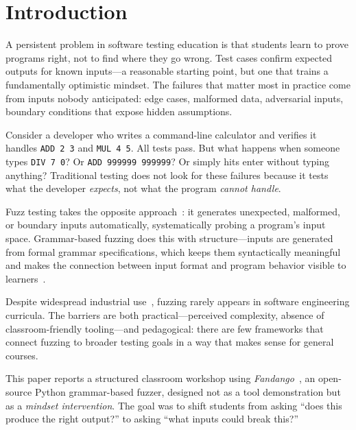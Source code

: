\documentclass[conference]{IEEEtran}
\begin{document}
\section{Introduction}
\label{sec:intro}

A persistent problem in software testing education is that students learn to prove programs right, not to find where they go wrong.
Test cases confirm expected outputs for known inputs---a reasonable starting point, but one that trains a fundamentally optimistic mindset.
The failures that matter most in practice come from inputs nobody anticipated: edge cases, malformed data, adversarial inputs, boundary conditions that expose hidden assumptions.

Consider a developer who writes a command-line calculator and verifies it handles \texttt{ADD 2 3} and \texttt{MUL 4 5}.
All tests pass.
But what happens when someone types \texttt{DIV 7 0}?
Or \texttt{ADD 999999 999999}?
Or simply hits enter without typing anything?
Traditional testing does not look for these failures because it tests what the developer \emph{expects}, not what the program \emph{cannot handle}.

Fuzz testing takes the opposite approach~\cite{miller1990empirical}: it generates unexpected, malformed, or boundary inputs automatically, systematically probing a program's input space.
Grammar-based fuzzing does this with structure---inputs are generated from formal grammar specifications, which keeps them syntactically meaningful and makes the connection between input format and program behavior visible to learners~\cite{aschermann2019nautilus, zeller2019fuzzing}.

Despite widespread industrial use~\cite{manes2019art}, fuzzing rarely appears in software engineering curricula.
The barriers are both practical---perceived complexity, absence of classroom-friendly tooling---and pedagogical: there are few frameworks that connect fuzzing to broader testing goals in a way that makes sense for general courses.

This paper reports a structured classroom workshop using \emph{Fandango}~\cite{fandango2025}, an open-source Python grammar-based fuzzer, designed not as a tool demonstration but as a \emph{mindset intervention}.
The goal was to shift students from asking ``does this produce the right output?'' to asking ``what inputs could break this?''
\end{document}
